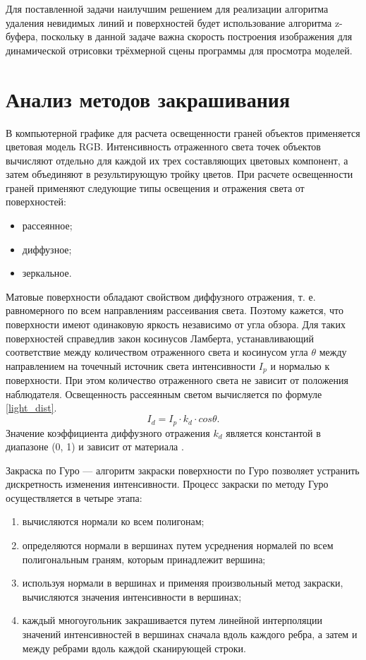 Для поставленной задачи наилучшим решением для реализации алгоритма удаления невидимых линий и поверхностей  будет использование алгоритма z-буфера, поскольку в данной задаче важна скорость построения изображения для динамической отрисовки трёхмерной сцены программы для просмотра моделей.

\section{Анализ методов закрашивания}

В компьютерной графике для расчета освещенности граней объектов применяется цветовая модель RGB. Интенсивность отраженного света точек объектов вычисляют отдельно для каждой их трех составляющих цветовых компонент, а затем объединяют в результирующую тройку цветов. При расчете освещенности граней применяют следующие типы освещения и отражения света от поверхностей: 
\begin{itemize}
\item рассеянное;
\item диффузное;
\item зеркальное.
\end{itemize}

Матовые поверхности обладают свойством диффузного отражения, т. е. равномерного по всем направлениям рассеивания света. Поэтому кажется, что поверхности имеют одинаковую яркость независимо от угла обзора. Для таких поверхностей справедлив закон косинусов Ламберта, устанавливающий соответствие между количеством отраженного света и косинусом угла $\theta$ между направлением на точечный источник света интенсивности $I_{p}$ и нормалью к поверхности. При этом количество отраженного света не зависит от положения наблюдателя. Освещенность рассеянным светом вычисляется по формуле \ref{light_dist}.
\begin{equation}\label{light_dist} 
I_{d} = I_{p} \cdot k_{d} \cdot cos \theta.
\end{equation}
Значение коэффициента диффузного отражения $k_{d}$ является константой в диапазоне (0, 1) и зависит от материала \cite{belcg}.

Закраска по Гуро — алгоритм закраски поверхности по Гуро позволяет устранить дискретность изменения интенсивности. Процесс закраски по методу Гуро осуществляется в четыре этапа:
\begin{enumerate}
\item вычисляются нормали ко всем полигонам;
\item определяются нормали в вершинах путем усреднения нормалей по всем полигональным граням, которым принадлежит вершина;
\item используя нормали в вершинах и применяя произвольный метод закраски, вычисляются значения интенсивности в вершинах;
\item каждый многоугольник закрашивается путем линейной интерполяции значений интенсивностей в вершинах сначала вдоль каждого ребра, а затем и между ребрами вдоль каждой сканирующей строки.
\end{enumerate}

